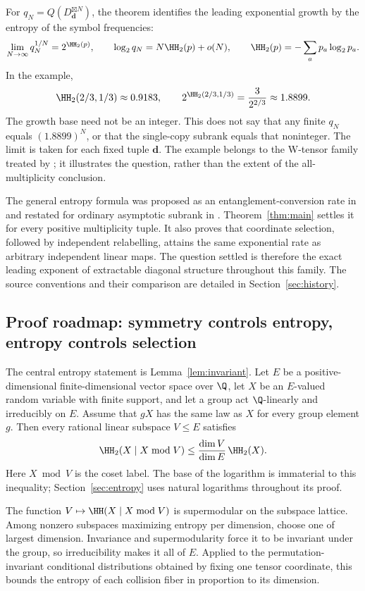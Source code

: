 For $q_N=Q(D_{\mathbf d}^{\boxtimes N})$, the theorem identifies the
leading exponential growth by the entropy of the symbol frequencies:
\[
 \lim_{N\to\infty}q_N^{1/N}=2^{\HH_2(p)},\qquad
 \log_2 q_N=N\HH_2(p)+o(N),\qquad
 \HH_2(p)=-\sum_a p_a\log_2 p_a.
\]
In the example,
\[
 \HH_2(2/3,1/3)\approx0.9183,\qquad
 2^{\HH_2(2/3,1/3)}=\frac{3}{2^{2/3}}\approx1.8899.
\]
The growth base need not be an integer. This does not say that any
finite $q_N$ equals $(1.8899)^N$, or that the single-copy subrank equals
that noninteger. The limit is taken for each fixed tuple $\mathbf d$.
The example belongs to the W-tensor family treated by
\citet[Theorem~11]{VC2015}; it illustrates the question, rather than
the extent of the all-multiplicity conclusion.

The general entropy formula was proposed as an entanglement-conversion
rate in \citet[Section~VI, equation~(40)]{VC2015} and restated for
ordinary asymptotic subrank in \citet[Conjecture~4.26]{OV2025}.
Theorem~\ref{thm:main} settles it for every positive multiplicity tuple.
It also proves that coordinate selection, followed by independent
relabelling, attains the same exponential rate as arbitrary independent
linear maps. The question settled is therefore the exact leading
exponent of extractable diagonal structure throughout this family.
The source conventions and their comparison are detailed in
Section~\ref{sec:history}.

\subsection*{Proof roadmap: symmetry controls entropy, entropy controls selection}

The central entropy statement is Lemma~\ref{lem:invariant}. Let $E$
be a positive-dimensional finite-dimensional vector space over $\Q$,
let $X$ be an $E$-valued random variable with finite support, and let a
group act $\Q$-linearly and irreducibly on $E$. Assume that $gX$ has
the same law as $X$ for every group element $g$. Then every rational
linear subspace $V\leq E$ satisfies
\[
 \HH_2(X\mid X\bmod V)
 \leq \frac{\dim V}{\dim E}\,\HH_2(X).
\]
Here $X\bmod V$ is the coset label. The base of the logarithm is
immaterial to this inequality; Section~\ref{sec:entropy} uses natural
logarithms throughout its proof.

The function $V\mapsto\HH(X\mid X\bmod V)$ is supermodular on the
subspace lattice. Among nonzero subspaces maximizing entropy per dimension,
choose one of largest dimension. Invariance and supermodularity force
it to be invariant under the group, so irreducibility makes it all of
$E$. Applied to the permutation-invariant conditional distributions
obtained by fixing one tensor coordinate, this bounds the entropy of
each collision fiber in proportion to its dimension.

